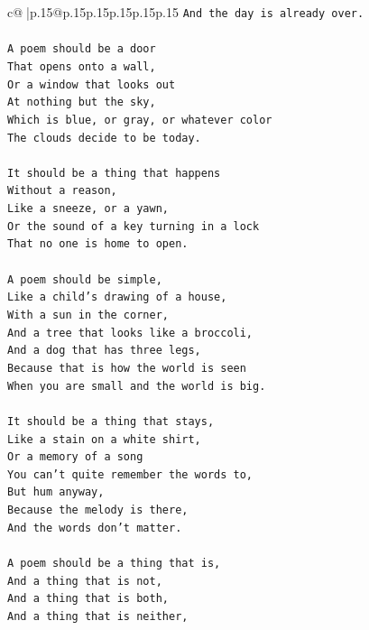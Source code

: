 \documentclass{article}
\begin{document}
{\begin{supertabular}{c@{$\;$}|p{.15\linewidth}@{}p{.15\linewidth}p{.15\linewidth}p{.15\linewidth}p{.15\linewidth}p{.15\linewidth}}
{{{\texttt{And the day is already over.} \\
\\ 
\texttt{A poem should be a door} \\
\texttt{That opens onto a wall,} \\
\texttt{Or a window that looks out} \\
\texttt{At nothing but the sky,} \\
\texttt{Which is blue, or gray, or whatever color} \\
\texttt{The clouds decide to be today.} \\
\\ 
\texttt{It should be a thing that happens} \\
\texttt{Without a reason,} \\
\texttt{Like a sneeze, or a yawn,} \\
\texttt{Or the sound of a key turning in a lock} \\
\texttt{That no one is home to open.} \\
\\ 
\texttt{A poem should be simple,} \\
\texttt{Like a child's drawing of a house,} \\
\texttt{With a sun in the corner,} \\
\texttt{And a tree that looks like a broccoli,} \\
\texttt{And a dog that has three legs,} \\
\texttt{Because that is how the world is seen} \\
\texttt{When you are small and the world is big.} \\
\\ 
\texttt{It should be a thing that stays,} \\
\texttt{Like a stain on a white shirt,} \\
\texttt{Or a memory of a song} \\
\texttt{You can't quite remember the words to,} \\
\texttt{But hum anyway,} \\
\texttt{Because the melody is there,} \\
\texttt{And the words don't matter.} \\
\\ 
\texttt{A poem should be a thing that is,} \\
\texttt{And a thing that is not,} \\
\texttt{And a thing that is both,} \\
\texttt{And a thing that is neither,} \\
}}}
\end{supertabular}}
\end{document}
